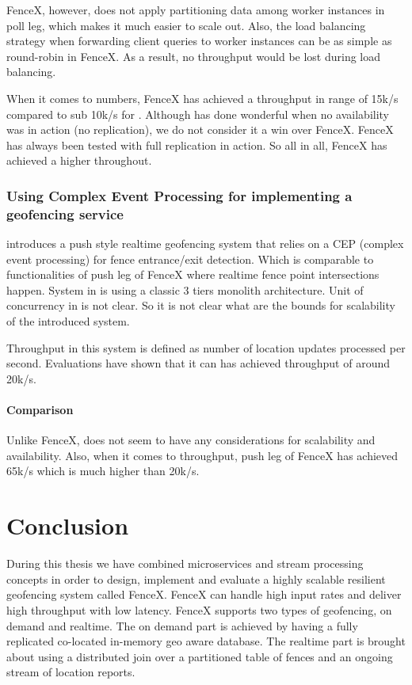 \documentclass[a4]{report}
\begin{document}
    FenceX, however, does not apply partitioning data among worker instances in poll leg, which makes it much easier to
    scale out.
    Also, the load balancing strategy when forwarding client queries to worker instances can be as simple as
    round-robin in FenceX.
    As a result, no throughput would be lost during load balancing.

    When it comes to numbers, FenceX has achieved a throughput in range of 15k/s compared to sub 10k/s for
    \cite{Cirillo-Jacobs-Martin-Szczytowski-2014}.
    Although \cite{Cirillo-Jacobs-Martin-Szczytowski-2014} has done wonderful when no availability was in action
    (no replication), we do not consider it a win over FenceX.
    FenceX has always been tested with full replication in action.
    So all in all, FenceX has achieved a higher throughout.

    \subsection{Using Complex Event Processing for implementing a geofencing service}
    \cite{Nechifor_Comnac_2013} introduces a push style realtime geofencing system that relies on a CEP
    (complex event processing) for fence entrance/exit detection.
    Which is comparable to functionalities of push leg of FenceX where realtime fence point intersections happen.
    System in \cite{Nechifor_Comnac_2013} is using a classic 3 tiers monolith architecture.
    Unit of concurrency in \cite{Nechifor_Comnac_2013} is not clear.
    So it is not clear what are the bounds for scalability of the introduced system.

    Throughput in this system is defined as number of location updates processed per second.
    Evaluations have shown that it can has achieved throughput of around 20k/s.

    \subsubsection{Comparison}
    Unlike FenceX, \cite{Nechifor_Comnac_2013} does not seem to have any considerations for
    scalability and availability.
    Also, when it comes to throughput, push leg of FenceX has achieved 65k/s which is much higher than 20k/s.


    \chapter{Conclusion}
    During this thesis we have combined microservices and stream processing concepts in order to design, implement
    and evaluate a highly scalable resilient geofencing system called FenceX.
    FenceX can handle high input rates and deliver high throughput with low latency.
    FenceX supports two types of geofencing, on demand and realtime.
    The on demand part is achieved by having a fully replicated co-located in-memory geo aware database.
    The realtime part is brought about using a distributed join over a partitioned table of fences and an ongoing
    stream of location reports.
\end{document}
